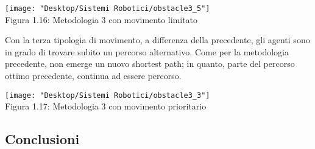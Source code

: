\documentclass[12pt,a4paper,openright,twoside]{report}
\begin{document}
\begin{center}  
	\texttt{[image: "Desktop/Sistemi Robotici/obstacle3\_5"]}
	\\Figura 1.16: Metodologia 3 con movimento limitato
\end{center}

Con la terza tipologia di movimento, a differenza della precedente, gli agenti sono in grado di trovare subito un percorso alternativo. Come per la metodologia precedente, non emerge un nuovo shortest path; in quanto, parte del percorso ottimo precedente, continua ad essere percorso.\\

\begin{center}  
	\texttt{[image: "Desktop/Sistemi Robotici/obstacle3\_3"]}
	\\Figura 1.17: Metodologia 3 con movimento prioritario
\end{center}

\subsection{Conclusioni}
\end{document}
